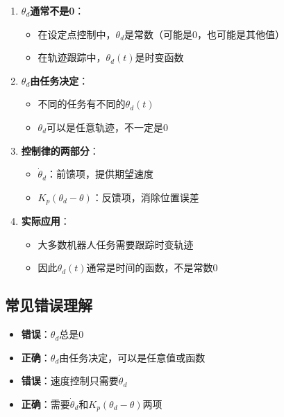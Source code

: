 \documentclass[12pt,a4paper]{article}
\begin{document}
\begin{enumerate}
\item \textbf{$\theta_d$通常不是0}：
\begin{itemize}
\item 在设定点控制中，$\theta_d$是常数（可能是0，也可能是其他值）
\item 在轨迹跟踪中，$\theta_d(t)$是时变函数
\end{itemize}

\item \textbf{$\theta_d$由任务决定}：
\begin{itemize}
\item 不同的任务有不同的$\theta_d(t)$
\item $\theta_d$可以是任意轨迹，不一定是0
\end{itemize}

\item \textbf{控制律的两部分}：
\begin{itemize}
\item $\dot{\theta}_d$：前馈项，提供期望速度
\item $K_p(\theta_d - \theta)$：反馈项，消除位置误差
\end{itemize}

\item \textbf{实际应用}：
\begin{itemize}
\item 大多数机器人任务需要跟踪时变轨迹
\item 因此$\theta_d(t)$通常是时间的函数，不是常数0
\end{itemize}
\end{enumerate}

\subsection{常见错误理解}

\begin{itemize}
\item \textbf{错误}：$\theta_d$总是0
\item \textbf{正确}：$\theta_d$由任务决定，可以是任意值或函数
\end{itemize}

\begin{itemize}
\item \textbf{错误}：速度控制只需要$\dot{\theta}_d$
\item \textbf{正确}：需要$\dot{\theta}_d$和$K_p(\theta_d - \theta)$两项
\end{itemize}
\end{document}
